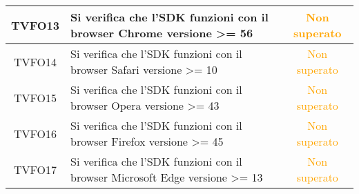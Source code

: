 \begin{center}
\begin{longtable}{|c|>{\centering}m{10cm}|c|}
		TVFO13 & Si verifica che l'SDK funzioni con il browser Chrome versione >= 56 & \textcolor{Orange}{Non superato}\\ \hline
		TVFO14 & Si verifica che l'SDK funzioni con il browser Safari versione >= 10 & \textcolor{Orange}{Non superato}\\ \hline
		TVFO15 & Si verifica che l'SDK funzioni con il browser Opera versione >= 43 & \textcolor{Orange}{Non superato}\\ \hline
		TVFO16 & Si verifica che l'SDK funzioni con il browser Firefox versione >= 45 & \textcolor{Orange}{Non superato}\\ \hline
		TVFO17 & Si verifica che l'SDK funzioni con il browser Microsoft Edge versione >= 13 & \textcolor{Orange}{Non superato}\\ \hline
	\end{longtable}
\end{center}
